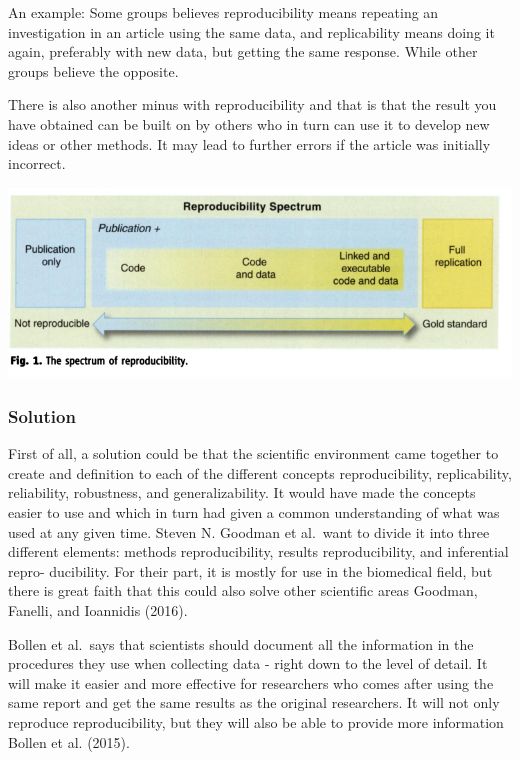 \documentclass[
]{article}
\begin{document}
An example: Some groups believes reproducibility means repeating an
investigation in an article using the same data, and replicability means
doing it again, preferably with new data, but getting the same response.
While other groups believe the opposite.

There is also another minus with reproducibility and that is that the
result you have obtained can be built on by others who in turn can use
it to develop new ideas or other methods. It may lead to further errors
if the article was initially incorrect.

\href{https://www.jstor.org/stable/pdf/41352177.pdf?refreqid=excelsior\%3A4042fa72b0c4b5ce6ed25e118e92172a}{\includegraphics{Roger Peng.PNG}}

\hypertarget{solution}{%
\subsubsection{Solution}\label{solution}}

First of all, a solution could be that the scientific environment came
together to create and definition to each of the different concepts
reproducibility, replicability, reliability, robustness, and
generalizability. It would have made the concepts easier to use and
which in turn had given a common understanding of what was used at any
given time. Steven N. Goodman et al.~want to divide it into three
different elements: methods reproducibility, results reproducibility,
and inferential repro- ducibility. For their part, it is mostly for use
in the biomedical field, but there is great faith that this could also
solve other scientific areas Goodman, Fanelli, and Ioannidis (2016).

Bollen et al.~says that scientists should document all the information
in the procedures they use when collecting data - right down to the
level of detail. It will make it easier and more effective for
researchers who comes after using the same report and get the same
results as the original researchers. It will not only reproduce
reproducibility, but they will also be able to provide more information
Bollen et al. (2015).
\end{document}
